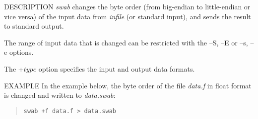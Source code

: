 \begin{synopsis}
\item [swab] [ --S $S_1$ ] [ --s $S_2$ ] [ --E $E_1$ ] [ --e $E_2$ ] 
 	    [ +$type$ ] [ {\em infile} ] 
\end{synopsis}

\begin{qsection}{DESCRIPTION}
{\em swab} changes the byte order 
(from big-endian to little-endian or vice versa) 
of the input data from {\em infile} (or standard input), 
and sends the result to standard output.

The range of input data that is changed can be restricted 
with the --S, --E or --s, --e options.

The +$type$ option specifies the input and output data formats.
\end{qsection}

\begin{options}
\end{options}

\begin{qsection}{EXAMPLE}
In the example below, the byte order of the file {\em data.f} in
float format is changed and written to {\em data.swab}:
\begin{quote}
 \verb!swab +f data.f > data.swab!
\end{quote} 
\end{qsection}

% 
